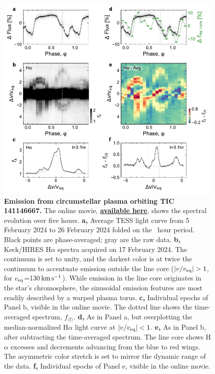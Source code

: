 \documentclass[11pt,twocolumn,tighten,linenumbers]{aastex7}
\newcommand{\kms}{\ensuremath{\rm km\,s^{-1}}}
\begin{document}
\begin{figure}[!t]
  \centering
  \includegraphics[width=0.99\textwidth]{figures/f2.pdf}
  \vspace{-0.25cm}
  \captionsetup{labelformat=moviefmt,labelsep=colon}
	\caption{\textbf{Emission from circumstellar plasma orbiting
TIC\,141146667.}
  The online movie,
  \href{https://lgbouma.com/movies/TIC141146667_sixpanel.mp4}{{\bf
  available here}},
  shows the spectral evolution over five hours.
  {\bf a,} Average TESS light curve from 5 February 2024 to 26
  February 2024 folded on the \periodhr\ hour period.  Black
  points are phase-averaged; gray are the raw data.
  {\bf b,} Keck/HIRES H$\alpha$ spectra acquired on 17
  February 2024.  The continuum is set to unity, and the darkest color
  is at twice the continuum to accentuate emission outside the line
  core ($|v/v_{\rm eq}|>1$, for $v_{\rm eq}$=130\,\kms).  While
  emission in the line core originates in the star's chromosphere,
  the sinusoidal emission features are most readily described by a
  warped plasma torus.
  {\bf c,} Individual epochs of Panel b, visible in the
  online movie.  The dotted line shows the time-averaged spectrum,
  $f_{\langle t \rangle}$.
  {\bf d,} As in Panel a, but overplotting the
  median-normalized H$\alpha$ light curve at $|v/v_{\rm eq}|<1$.
  {\bf e,} As in Panel b, after subtracting the time-averaged
  spectrum.  The line core shows H$\alpha$ excesses and decrements
  advancing from the blue to red wings.
  The asymmetric color stretch
  is set to mirror the dynamic range of the data.
  {\bf f,} Individual epochs of Panel e, visible in the online
  movie.}
  \label{fig:spec}
\end{figure}
\end{document}
